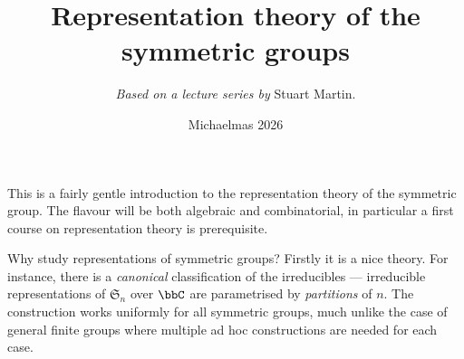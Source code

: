 \title{Representation theory of the symmetric groups}
\author{\textit{Based on a lecture series by} Stuart Martin.}
\date{Michaelmas 2026}
\maketitle

\newcommand{\mat}[1]{\left(\begin{smallmatrix} #1 \end{smallmatrix}\right)}
\newcommand{\nomat}[1]{\begin{smallmatrix} #1 \end{smallmatrix}}
\newcommand{\Mat}[1]{\textnormal{Mat}_{#1 \times #1}}
\newcommand{\adj}{\textnormal{ad}}
\newcommand{\bb}{\mathfrak{b}}
\newcommand{\nn}{\mathfrak{n}}
\renewcommand{\gl}{\mathfrak{gl}}
\renewcommand{\sl}{\mathfrak{sl}}
\newcommand{\so}{\mathfrak{so}}
\renewcommand{\sp}{\mathfrak{sp}}
\renewcommand{\sf}{\mathsf}

\newcommand{\calP}{\mathcal{P}}

\newcommand{\GL}[1]{\mathsf{GL}(#1)}

\newcommand{\sym}[1]{\mathfrak{S}_{#1}}
\newcommand{\sgn}{\textnormal{sgn}}

\newcommand{\tableau}[1]{
    \ytableausetup{boxsize=1em, notabloids, nosmalltableaux, nobaseline, textmode}
    \ytableaushort{#1}
    \ytableausetup{boxsize=normal, notabloids, nosmalltableaux, baseline,
    mathmode}
}
\newcommand{\tabloid}[1]{
    \ytableausetup{boxsize=1em, tabloids, nosmalltableaux, nobaseline, textmode}
    \ytableaushort{#1}
    \ytableausetup{boxsize=normal, notabloids, nosmalltableaux, baseline,
    mathmode}
}
\newcommand{\smalltableau}[1]{
    \ytableausetup{boxsize=0.5em, notabloids, nosmalltableaux, nobaseline, textmode}
    \ytableaushort[\scriptsize]{#1}
    \ytableausetup{boxsize=normal, notabloids, nosmalltableaux, baseline,
    mathmode}
}
\newcommand{\smalltabloid}[1]{
    \ytableausetup{boxsize=0.5em, tabloids, nosmalltableaux, nobaseline, textmode}
    \ytableaushort[\scriptsize]{#1}
    \ytableausetup{boxsize=normal, notabloids, nosmalltableaux, baseline,
    mathmode}
}



This is a fairly gentle introduction to the representation theory of the
symmetric group. The flavour will be both algebraic and combinatorial, in
particular a first course on representation theory is prerequisite.

Why study representations of symmetric groups? Firstly it is a nice theory. For
instance, there is a \emph{canonical} classification of the irreducibles ---
irreducible representations of $\sym{n}$ over $\bbC$ are parametrised by
\emph{partitions} of $n$. The construction works uniformly for all symmetric
groups, much unlike the case of general finite groups where multiple ad hoc
constructions are needed for each case. 

